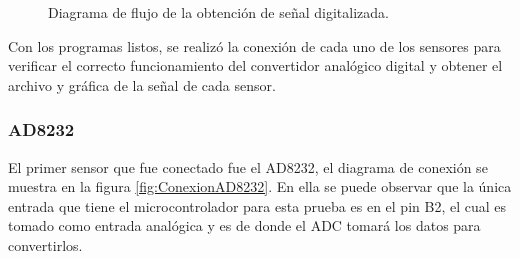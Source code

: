 	\begin{figure}[htbp!]
		\centering
		\caption{Diagrama de flujo de la obtención de señal digitalizada.}
		\label{fig:FlujoSerial}
	\end{figure}
\newpage		
Con los programas listos, se realizó la conexión de cada uno de los sensores para verificar el  correcto funcionamiento del convertidor analógico digital y obtener el archivo y gráfica de la señal de cada sensor.\\

\subsubsection{AD8232}
El primer sensor que fue conectado fue el AD8232, el diagrama de conexión se muestra en la figura \ref{fig:ConexionAD8232}. En ella se puede observar que la única entrada que tiene el microcontrolador para esta prueba es en el pin B2, el cual es tomado como entrada analógica y es de donde el ADC tomará los datos para convertirlos.\\

